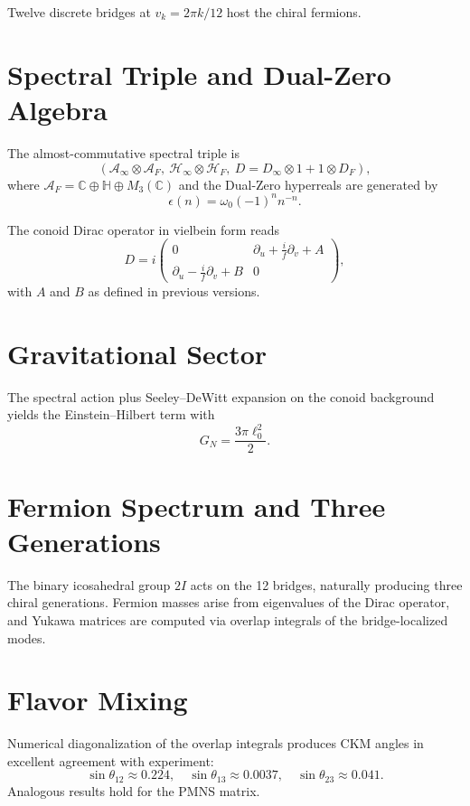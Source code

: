 \documentclass[11pt,a4paper]{article}
\begin{document}
Twelve discrete bridges at \(v_k = 2\pi k / 12\) host the chiral fermions.

\section{Spectral Triple and Dual-Zero Algebra}

The almost-commutative spectral triple is
\[
(\mathcal{A}_\infty \otimes \mathcal{A}_F, \ \mathcal{H}_\infty \otimes \mathcal{H}_F, \ D = D_\infty \otimes 1 + 1 \otimes D_F),
\]
where \(\mathcal{A}_F = \mathbb{C} \oplus \mathbb{H} \oplus M_3(\mathbb{C})\) and the Dual-Zero hyperreals are generated by
\[
\epsilon(n) = \omega_0 (-1)^n n^{-n}.
\]

The conoid Dirac operator in vielbein form reads
\[
D = i\begin{pmatrix}
0 & \partial_u + \frac{i}{f}\partial_v + A \\
\partial_u - \frac{i}{f}\partial_v + B & 0
\end{pmatrix},
\]
with \(A\) and \(B\) as defined in previous versions.

\section{Gravitational Sector}

The spectral action plus Seeley–DeWitt expansion on the conoid background yields the Einstein–Hilbert term with
\[
G_N = \frac{3\pi \ell_0^2}{2}.
\]

\section{Fermion Spectrum and Three Generations}

The binary icosahedral group \(2I\) acts on the 12 bridges, naturally producing three chiral generations. Fermion masses arise from eigenvalues of the Dirac operator, and Yukawa matrices are computed via overlap integrals of the bridge-localized modes.

\section{Flavor Mixing}

Numerical diagonalization of the overlap integrals produces CKM angles in excellent agreement with experiment:
\[
\sin\theta_{12} \approx 0.224, \quad \sin\theta_{13} \approx 0.0037, \quad \sin\theta_{23} \approx 0.041.
\]
Analogous results hold for the PMNS matrix.
\end{document}
